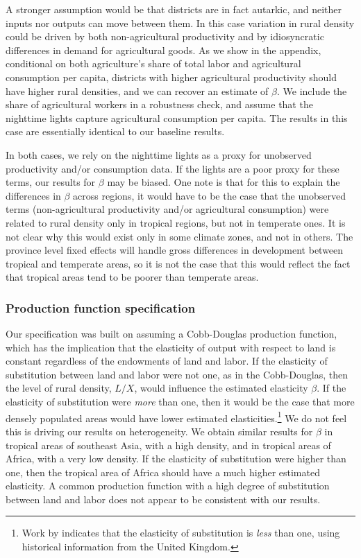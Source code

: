 \documentclass[11pt]{article}
\begin{document}
A stronger assumption would be that districts are in fact autarkic, and neither inputs nor outputs can move between them. In this case variation in rural density could be driven by both non-agricultural productivity and by idiosyncratic differences in demand for agricultural goods. As we show in the appendix, conditional on both agriculture's share of total labor and agricultural consumption per capita, districts with higher agricultural productivity should have higher rural densities, and we can recover an estimate of $\beta$. We include the share of agricultural workers in a robustness check, and assume that the nighttime lights capture agricultural consumption per capita. The results in this case are essentially identical to our baseline results. 

In both cases, we rely on the nighttime lights as a proxy for unobserved productivity and/or consumption data. If the lights are a poor proxy for these terms, our results for $\beta$ may be biased. One note is that for this to explain the differences in $\beta$ across regions, it would have to be the case that the unobserved terms (non-agricultural productivity and/or agricultural consumption) were related to rural density only in tropical regions, but not in temperate ones. It is not clear why this would exist only in some climate zones, and not in others. The province level fixed effects will handle gross differences in development between tropical and temperate areas, so it is not the case that this would reflect the fact that tropical areas tend to be poorer than temperate areas.

\subsubsection{Production function specification} 
Our specification was built on assuming a Cobb-Douglas production function, which has the implication that the elasticity of output with respect to land is constant regardless of the endowments of land and labor. If the elasticity of substitution between land and labor were not one, as in the Cobb-Douglas, then the level of rural density, $L/X$, would influence the estimated elasticity $\beta$. If the elasticity of substitution were \textit{more} than one, then it would be the case that more densely populated areas would have lower estimated elasticities.\footnote{Work by \citet{wilde2012} indicates that the elasticity of substitution is \textit{less} than one, using historical information from the United Kingdom.} We do not feel this is driving our results on heterogeneity. We obtain similar results for $\beta$ in tropical areas of southeast Asia, with a high density, and in tropical areas of Africa, with a very low density. If the elasticity of substitution were higher than one, then the tropical area of Africa should have a much higher estimated elasticity. A common production function with a high degree of substitution between land and labor does not appear to be consistent with our results.
\end{document}
